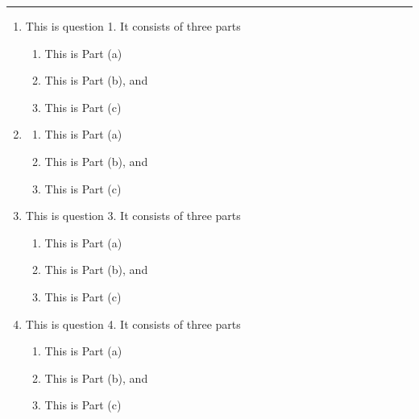 \documentclass[12pt,fleqn]{exampaper}
\begin{document}
\blindenumerate

\vspace{10mm} \hrule \vspace{10mm}


\begin{enumerate}
  \item This is question 1. It consists of three parts
  \begin{enumerate}
    \item This is Part (a)
    \item This is Part (b), and
    \item This is Part (c)
  \end{enumerate}

  \item
  \begin{enumerate}
    \item This is Part (a)
    \item This is Part (b), and
    \item This is Part (c)
  \end{enumerate}

\newpage

  \item This is question 3. It consists of three parts
  \begin{enumerate}
    \item This is Part (a)
    \item This is Part (b), and
    \item This is Part (c)
  \end{enumerate}

  \item This is question 4. It consists of three parts
  \begin{enumerate}
    \item This is Part (a)
    \item This is Part (b), and
    \item This is Part (c)
  \end{enumerate}

\end{enumerate}
\end{document}

